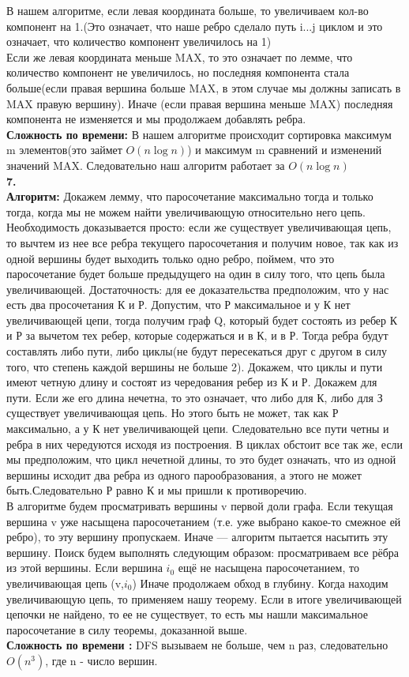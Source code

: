 \documentclass[a4paper,12pt]{article}
\begin{document}
В нашем алгоритме, если левая координата больше, то увеличиваем кол-во компонент на 1.(Это означает, что наше ребро сделало путь i...j циклом и это означает, что количество компонент увеличилось на 1)\\
Если же левая координата меньше MAX, то это означает по лемме, что количество компонент не увеличилось, но последняя компонента стала больше(если правая вершина больше MAX, в этом случае мы должны записать в MAX правую вершину). Иначе (если правая вершина меньше MAX) последняя компонента не изменяется и мы продолжаем добавлять ребра.\\
\textbf{Сложность по времени:} В нашем алгоритме происходит сортировка максимум m элементов(это займет $O(n\log n)$) и максимум m сравнений и изменений значений MAX. Следовательно наш алгоритм работает за $O(n\log n)$\\
\textbf{7.}\\
\textbf{Алгоритм:} Докажем лемму, что паросочетание максимально тогда и только тогда, когда мы не можем найти увеличивающую относительно него цепь. Необходимость доказывается просто: если же существует увеличивающая цепь, то вычтем из нее все ребра текущего паросочетания и получим новое, так как из одной вершины будет выходить только одно ребро, поймем, что это паросочетание будет больше предыдущего на один в силу того, что цепь была увеличивающей. Достаточность: для ее доказательства предположим, что у нас есть два просочетания К и Р. Допустим, что Р максимальное и у К нет увеличивающей цепи, тогда получим граф Q, который будет состоять из ребер К и Р за вычетом тех ребер, которые содержаться и в К, и в Р. Тогда ребра будут составлять либо пути, либо циклы(не будут пересекаться друг с другом в силу того, что степень каждой вершины не больше 2). Докажем, что циклы и пути имеют четную длину и состоят из чередования ребер из К и Р. Докажем для пути. Если же его длина нечетна, то это означает, что либо для К, либо для З существует увеличивающая цепь. Но этого быть не может, так как Р максимально, а у К нет увеличивающей цепи. Следовательно все пути четны и ребра в них чередуются исходя из построения. В циклах обстоит все так же, если мы предположим, что цикл нечетной длины, то это будет означать, что из одной вершины исходит два ребра из одного парообразования, а этого не может быть.Следовательно Р равно К и мы пришли к противоречию.\\
В алгоритме будем просматривать вершины v первой доли графа. Если текущая вершина v уже насыщена паросочетанием (т.е. уже выбрано какое-то смежное ей ребро), то эту вершину пропускаем. Иначе — алгоритм пытается насытить эту вершину. Поиск будем выполнять следующим образом: просматриваем все рёбра из этой вершины. Если вершина $i_0$ ещё не насыщена паросочетанием, то увеличивающая цепь (v,$i_0$) Иначе продолжаем обход в глубину. Когда находим увеличивающую цепь, то применяем нашу теорему. Если в итоге увеличивающей цепочки не найдено, то ее не существует, то есть мы нашли максимальное паросочетание в силу теоремы, доказанной выше.\\
 \textbf{Сложность по времени :}  DFS вызываем не больше, чем n раз, следовательно $O(n^3)$, где n - число вершин.
\end{document}

